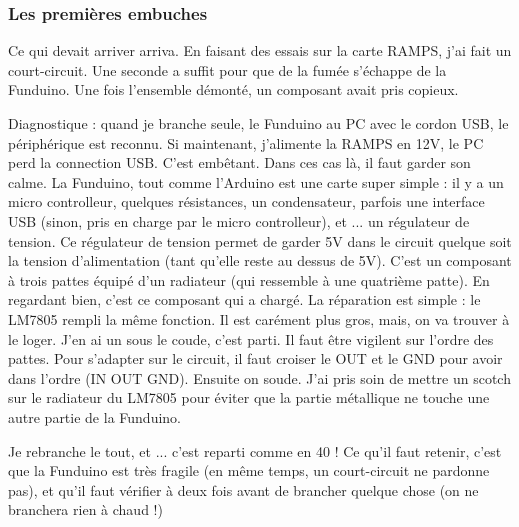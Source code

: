 \subsubsection{Les premières embuches}
Ce qui devait arriver arriva. En faisant des essais sur la carte RAMPS, j'ai fait un %
court-circuit. Une seconde a suffit pour que de la fumée s'échappe de la Funduino. Une %
fois l'ensemble démonté, un composant avait pris copieux. \par %
Diagnostique : quand je branche seule, le Funduino au PC avec le cordon USB, le %
périphérique est reconnu. Si maintenant, j'alimente la RAMPS en 12V, le PC perd la %
connection USB. C'est embêtant. Dans ces cas là, il faut garder son calme. La %
Funduino, tout comme l'Arduino est une carte super simple : il y a un micro controlleur, %
quelques résistances, un condensateur, parfois une interface USB (sinon, pris en charge %
par le micro controlleur), et ... un régulateur de tension. Ce régulateur de tension %
permet de garder 5V dans le circuit quelque soit la tension d'alimentation (tant qu'elle%
reste au dessus de 5V). C'est un composant à trois pattes équipé d'un radiateur (qui %
ressemble à une quatrième patte). En regardant bien, c'est ce composant qui a chargé. %
La réparation est simple : le LM7805 rempli la même fonction. Il est carément plus gros, %
mais, on va trouver à le loger. J'en ai un sous le coude, c'est parti. Il faut être %
vigilent sur l'ordre des pattes. Pour s'adapter sur le circuit, il faut croiser le OUT %
et le GND pour avoir dans l'ordre (IN OUT GND). Ensuite on soude. J'ai pris soin de %
mettre un scotch sur le radiateur du LM7805 pour éviter que la partie métallique ne %
touche une autre partie de la Funduino.\par{} %
Je rebranche le tout, et ... c'est reparti comme en 40 ! Ce qu'il faut retenir, c'est %
que la Funduino est très fragile (en même temps, un court-circuit ne pardonne pas), %
et qu'il faut vérifier à deux fois avant de brancher quelque chose (on ne branchera %
rien à chaud !)